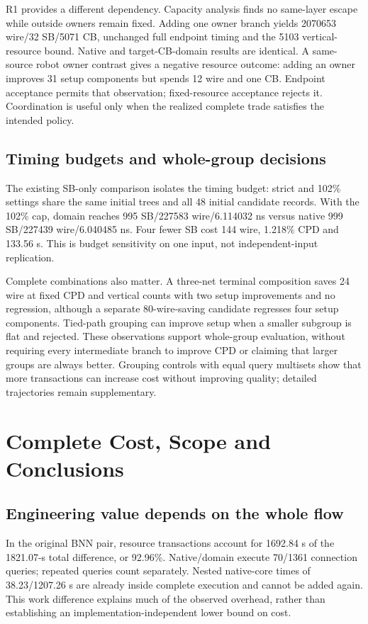 \documentclass[conference,10pt]{IEEEtran}
\begin{document}
R1 provides a different dependency. Capacity analysis finds no same-layer escape while outside owners remain fixed. Adding one owner branch yields 2070653 wire/32 SB/5071 CB, unchanged full endpoint timing and the 5103 vertical-resource bound. Native and target-CB-domain results are identical. A same-source robot owner contrast gives a negative resource outcome: adding an owner improves 31 setup components but spends 12 wire and one CB. Endpoint acceptance permits that observation; fixed-resource acceptance rejects it. Coordination is useful only when the realized complete trade satisfies the intended policy.

\subsection{Timing budgets and whole-group decisions}
The existing SB-only comparison isolates the timing budget: strict and 102\% settings share the same initial trees and all 48 initial candidate records. With the 102\% cap, domain reaches 995 SB/227583 wire/6.114032 ns versus native 999 SB/227439 wire/6.040485 ns. Four fewer SB cost 144 wire, 1.218\% CPD and 133.56 s. This is budget sensitivity on one input, not independent-input replication.

Complete combinations also matter. A three-net terminal composition saves 24 wire at fixed CPD and vertical counts with two setup improvements and no regression, although a separate 80-wire-saving candidate regresses four setup components. Tied-path grouping can improve setup when a smaller subgroup is flat and rejected. These observations support whole-group evaluation, without requiring every intermediate branch to improve CPD or claiming that larger groups are always better. Grouping controls with equal query multisets show that more transactions can increase cost without improving quality; detailed trajectories remain supplementary.

\section{Complete Cost, Scope and Conclusions}
\subsection{Engineering value depends on the whole flow}
In the original BNN pair, resource transactions account for 1692.84 s of the 1821.07-s total difference, or 92.96\%. Native/domain execute 70/1361 connection queries; repeated queries count separately. Nested native-core times of 38.23/1207.26 s are already inside complete execution and cannot be added again. This work difference explains much of the observed overhead, rather than establishing an implementation-independent lower bound on cost.
\end{document}
